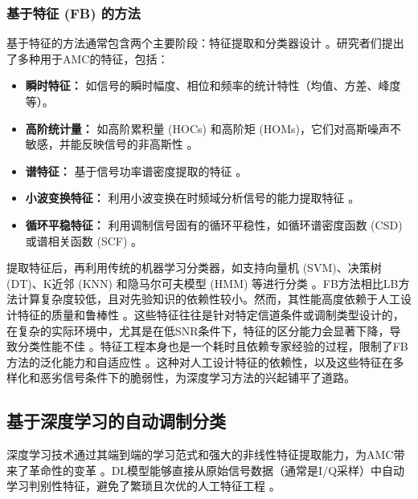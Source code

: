 \documentclass[conference]{IEEEtran}
\begin{document}
\subsubsection{基于特征 (FB) 的方法}
基于特征的方法通常包含两个主要阶段：特征提取和分类器设计 \cite{[5]}\cite{[10]}。研究者们提出了多种用于AMC的特征，包括：
\begin{itemize}
    \item \textbf{瞬时特征：} 如信号的瞬时幅度、相位和频率的统计特性（均值、方差、峰度等）\cite{[27]}。
    \item \textbf{高阶统计量：} 如高阶累积量 (HOCs) 和高阶矩 (HOMs)，它们对高斯噪声不敏感，并能反映信号的非高斯性 \cite{[10]}\cite{[27]}。
    \item \textbf{谱特征：} 基于信号功率谱密度提取的特征 \cite{[27]}。
    \item \textbf{小波变换特征：} 利用小波变换在时频域分析信号的能力提取特征 \cite{[27]}。
    \item \textbf{循环平稳特征：} 利用调制信号固有的循环平稳性，如循环谱密度函数 (CSD) 或谱相关函数 (SCF) \cite{[5]}。
\end{itemize}
提取特征后，再利用传统的机器学习分类器，如支持向量机 (SVM)、决策树 (DT)、K近邻 (KNN) 和隐马尔可夫模型 (HMM) 等进行分类 \cite{[5]}\cite{[10]}\cite{[33]}。FB方法相比LB方法计算复杂度较低，且对先验知识的依赖性较小。然而，其性能高度依赖于人工设计特征的质量和鲁棒性 \cite{[9]}\cite{[31]}。这些特征往往是针对特定信道条件或调制类型设计的，在复杂的实际环境中，尤其是在低SNR条件下，特征的区分能力会显著下降，导致分类性能不佳 \cite{[5]}\cite{[10]}。特征工程本身也是一个耗时且依赖专家经验的过程，限制了FB方法的泛化能力和自适应性 \cite{[9]}\cite{[10]}。这种对人工设计特征的依赖性，以及这些特征在多样化和恶劣信号条件下的脆弱性，为深度学习方法的兴起铺平了道路。

\subsection{基于深度学习的自动调制分类}
深度学习技术通过其端到端的学习范式和强大的非线性特征提取能力，为AMC带来了革命性的变革 \cite{[10]}\cite{[11]}\cite{[12]}。DL模型能够直接从原始信号数据（通常是I/Q采样）中自动学习判别性特征，避免了繁琐且次优的人工特征工程 \cite{[10]}\cite{[12]}。
\end{document}
